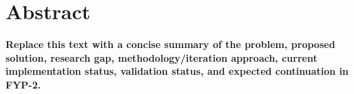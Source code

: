 \chapter*{Abstract}
\textbf{Replace this text with a concise summary of the problem, proposed solution, research gap, methodology/iteration approach, current implementation status, validation status, and expected continuation in FYP-2.}
